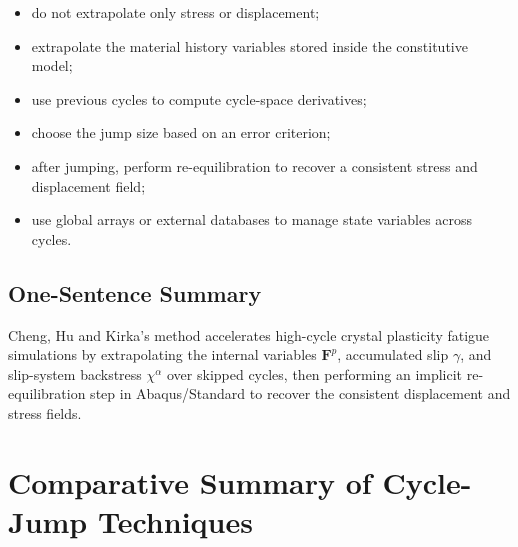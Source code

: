 ﻿\documentclass[11pt,a4paper]{article}
\begin{document}
\begin{itemize}[leftmargin=*]
    \item do not extrapolate only stress or displacement;
    \item extrapolate the material history variables stored inside the constitutive model;
    \item use previous cycles to compute cycle-space derivatives;
    \item choose the jump size based on an error criterion;
    \item after jumping, perform re-equilibration to recover a consistent stress and displacement field;
    \item use global arrays or external databases to manage state variables across cycles.
\end{itemize}

\subsection{One-Sentence Summary}

Cheng, Hu and Kirka's method accelerates high-cycle crystal plasticity fatigue simulations by extrapolating the internal variables $\bm{F}^p$, accumulated slip $\gamma$, and slip-system backstress $\chi^\alpha$ over skipped cycles, then performing an implicit re-equilibration step in Abaqus/Standard to recover the consistent displacement and stress fields.

\section{Comparative Summary of Cycle-Jump Techniques}
\end{document}
